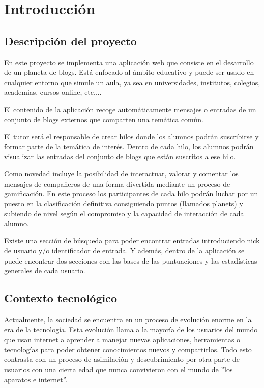 \documentclass[a4paper, 12pt]{book}
\begin{document}
\cleardoublepage
\chapter{Introducci\'on}
\label{sec:intro} %

\section{Descripci\'on del proyecto}
\label{sec:descripcion}
En este proyecto se implementa una aplicaci\'on web que consiste en el desarrollo de un planeta de blogs. Est\'a enfocado al \'ambito educativo y puede
ser usado en cualquier entorno que simule un aula, ya sea en universidades, institutos, colegios, academias, cursos online, etc,...

El contenido de la aplicaci\'on recoge autom\'aticamente mensajes o entradas de un conjunto de blogs externos que comparten una tem\'atica com\'un.

El tutor ser\'a el responsable de crear hilos donde los alumnos podr\'an suscribirse y formar parte de la tem\'atica de inter\'es. Dentro de cada hilo,
los alumnos podr\'an visualizar las entradas del conjunto de blogs que est\'an suscritos a ese hilo.

Como novedad incluye la posibilidad de interactuar, valorar y comentar los mensajes de compa\~neros de una forma divertida mediante un proceso de 
gamificaci\'on. En este proceso los participantes de cada hilo podr\'an luchar por un puesto en la clasificaci\'on definitiva consiguiendo 
puntos (llamados planets) y subiendo de nivel seg\'un el compromiso y la capacidad de interacci\'on de cada alumno.

Existe una secci\'on de b\'usqueda para poder encontrar entradas introduciendo nick de usuario y/o identificador de entrada. Y adem\'as, dentro de la
aplicaci\'on se puede encontrar dos secciones con las bases de las puntuaciones y las estad\'isticas generales de cada usuario.

\section{Contexto tecnol\'ogico}
\label{sec:contexto}
Actualmente, la sociedad se encuentra en un proceso de evoluci\'on enorme en la era de la tecnolog\'ia. Esta evoluci\'on llama a la mayor\'ia 
de los usuarios del mundo que usan internet a aprender a manejar nuevas aplicaciones, herramientas o tecnolog\'ias para poder obtener 
conocimientos nuevos y compartirlos.
Todo esto contrasta con un proceso de asimilaci\'on y descubrimiento por otra parte de usuarios con una cierta edad que nunca convivieron con 
el mundo de ''los aparatos e internet''.
\end{document}
